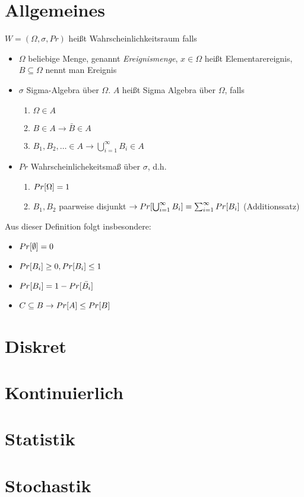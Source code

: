 \section{Allgemeines}
\begin{definition}[Wahrscheinlichkeitsraum]
	$W=(\Omega, \sigma, Pr)$ heißt Wahrscheinlichkeitsraum falls
	\begin{itemize}[noitemsep]
		\item $\Omega$ beliebige Menge, genannt \emph{Ereignismenge}, $x \in \Omega$ heißt Elementarereignis, $B \subseteq \Omega$ nennt man Ereignis
		\item $\sigma$ Sigma-Algebra über $\Omega$. $A$ heißt Sigma Algebra über $\Omega$, falls
		\begin{enumerate}[noitemsep]
			\item $\Omega \in A$
			\item $B \in  A \rightarrow \bar{B} \in A$
			\item $B_1, B_2, \dots \in A \rightarrow \bigcup_{i = 1}^\infty B_i \in A$
		\end{enumerate}
	\item $Pr$ Wahrscheinlichekeitsmaß über $\sigma$, d.h.
	\begin{enumerate}[noitemsep]
		\item $Pr[\Omega] = 1$
		\item $B_1, B_2$ paarweise disjunkt $\rightarrow Pr[\bigcup_{i = 1}^\infty B_i] = \sum_{i=1}^\infty Pr[B_i]$ (Additionssatz)
	\end{enumerate}
	\end{itemize}
	Aus dieser Definition folgt insbesondere:
	\begin{itemize}[noitemsep]
		\item $Pr[\emptyset] = 0$
		\item $Pr[B_i] \geq 0, Pr[B_i] \leq 1 $
		\item $Pr[B_i] = 1 - Pr[\bar{B_i}]$
		\item $C \subseteq B \rightarrow Pr[A] \leq Pr[B]$
	\end{itemize}
\end{definition}


	
\section{Diskret}

\section{Kontinuierlich}

\section{Statistik}

\section{Stochastik}

\pagebreak